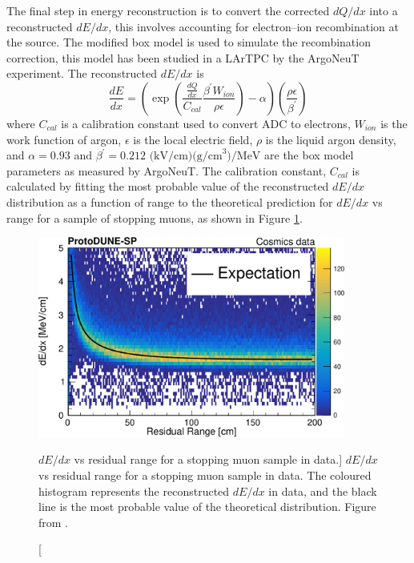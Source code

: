 The final step in energy reconstruction is to convert the corrected $dQ/dx$ into
a reconstructed $dE/dx$, this involves accounting for electron--ion
recombination at the source. The modified box model is used to simulate the
recombination correction, this model has been studied in a LArTPC by the 
ArgoNeuT experiment\cite{Acciarri2013a}. The reconstructed $dE/dx$ is 
\begin{equation*}
	\frac{dE}{dx} = \left( \exp \left( \frac{\frac{dQ}{dx}}{C_{cal}} \frac{\beta^\prime
	W_{ion}}{\rho \epsilon} \right) - \alpha \right)
	\left( \frac{\rho \epsilon}{\beta^\prime} \right)
\end{equation*}
where $C_{cal}$ is a calibration constant used to convert ADC to electrons,
$W_{ion}$ is the work function of argon, $\epsilon$ is the local electric field,
$\rho$ is the liquid argon density, and \(\alpha = 0.93\) and 
\(\beta^\prime = 0.212 \mbox{ (kV/cm)(g/cm}^3) / \mbox{MeV}\) are the box model 
parameters as measured by ArgoNeuT. The calibration constant, $C_{cal}$ is 
calculated by fitting the most probable value of the reconstructed $dE/dx$ 
distribution as a function of range to the theoretical prediction for $dE/dx$ 
vs range for a sample of stopping muons, as shown in Figure \ref{fig:dedx_v_rr}.

\begin{figure}

	\centering

	\includegraphics[width=0.9\textwidth]{figures/dedx_v_rr.pdf}

	\caption
	[$dE/dx$ vs residual range for a stopping muon sample in \protodune{} data.]
	{$dE/dx$ vs residual range for a stopping muon sample in \protodune{} data.
	The coloured histogram represents the reconstructed $dE/dx$ in \protodune{}
	data, and the black line is the most probable value of the theoretical 
	distribution. Figure from \cite{protoduneperf}.}

	\label{fig:dedx_v_rr}

\end{figure}

